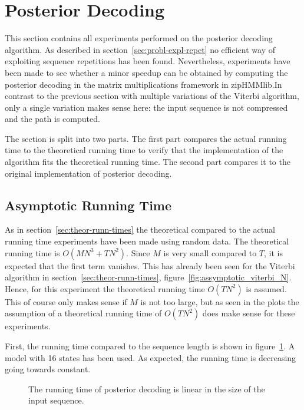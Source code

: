 \section{Posterior Decoding}

This section contains all experiments performed on the posterior decoding
algorithm. As described in section~\ref{sec:probl-expl-repet} no efficient way
of exploiting sequence repetitions has been found. Nevertheless, experiments
have been made to see whether a minor speedup can be obtained by computing the
posterior decoding in the matrix multiplications framework in zipHMMlib.\@ In
contrast to the previous section with multiple variations of the Viterbi
algorithm, only a single variation makes sense here: the input sequence is not
compressed and the path is computed.

The section is split into two parts. The first part compares the actual running
time to the theoretical running time to verify that the implementation of the
algorithm fits the theoretical running time. The second part compares it to the
original implementation of posterior decoding.

\subsection{Asymptotic Running Time}
\label{sec:asympt-runn-time}

As in section~\ref{sec:theor-runn-times} the theoretical compared to the actual
running time experiments have been made using random data. The theoretical
running time is $O(M N^3 + TN^2)$. Since $M$ is very small compared to $T$, it
is expected that the first term vanishes. This has already been seen for the Viterbi
algorithm in section~\ref{sec:theor-runn-times},
figure~\ref{fig:assymptotic_viterbi_N}. Hence, for this experiment the
theoretical running time $O(TN^2)$ is assumed. This of course only makes sense
if $M$ is not too large, but as seen in the plots the assumption of a
theoretical running time of $O(TN^2)$ does make sense for these experiments.

First, the running time compared to the sequence length is shown in
figure~\ref{fig:posterior_T}. A model with 16 states has been used. As expected,
the running time is decreasing going towards constant.

\begin{figure}
  \centering
  
  \caption{The running time of posterior decoding is linear in the size of the
    input sequence.}
  \label{fig:posterior_T}
\end{figure}

